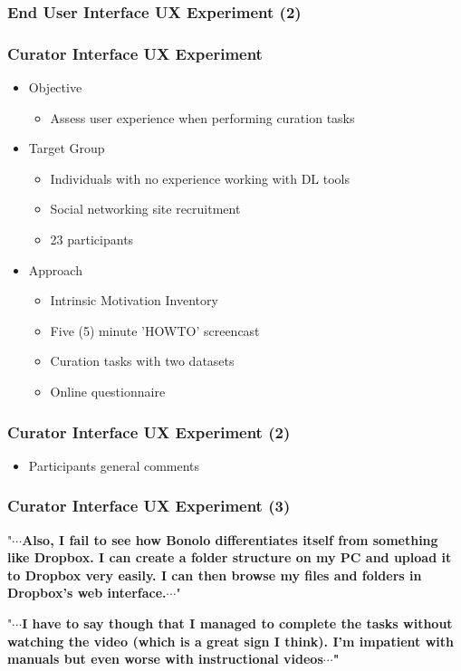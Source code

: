 \documentclass[xcolor=dvitex,t,11pt]{beamer}
\begin{document}
\begin{frame}[fragile]
\frametitle{End User Interface UX Experiment (2)}
\centering

\end{frame}

\begin{frame}[fragile]
\frametitle{Curator Interface UX Experiment}
\begin{itemize}
\item Objective
\begin{itemize}
\item Assess user experience when performing curation tasks
\end{itemize}
\item Target Group
\begin{itemize}
\item Individuals with no experience working with DL tools
\item Social networking site recruitment
\item 23 participants
\end{itemize}
\item Approach
\begin{itemize}
\item Intrinsic Motivation Inventory
\item Five (5) minute 'HOWTO' screencast
\item Curation tasks with two datasets
\item Online questionnaire
\end{itemize}
\end{itemize}
\end{frame}


\begin{frame}[fragile]
\frametitle{Curator Interface UX Experiment (2)}
\centering

\end{frame}


\begin{frame}[fragile]

\begin{itemize}
\item Participants general comments
\end{itemize}

\frametitle{Curator Interface UX Experiment (3)}
"\textbf{$\cdots$Also, I fail to see how Bonolo differentiates itself from something like Dropbox. I can create a folder structure on my PC and upload it to Dropbox very easily. I can then browse my files and folders in Dropbox's web interface.$\cdots$}"\\

\bigskip

"\textbf{$\cdots$I have to say though that I managed to complete the tasks without watching the video (which is a great sign I think). I'm impatient with manuals but even worse with instructional videos$\cdots$"}
\end{frame}
\end{document}
